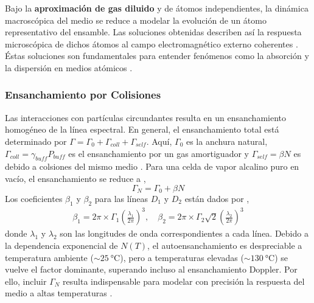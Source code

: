 Bajo la \textbf{aproximación de gas diluido} y de átomos independientes, la dinámica macroscópica del medio se reduce a modelar la evolución de un átomo representativo del ensamble. Las soluciones obtenidas describen así la respuesta microscópica de dichos átomos al campo electromagnético externo coherentes \cite{allenOpticalResonanceTwolevel1975}. Éstas soluciones son fundamentales para entender fenómenos como la absorción y  la dispersión en medios atómicos \cite{siddonsAbsoluteAbsorptionRubidium2008, fleischhauerElectromagneticallyInducedTransparency2005a}.
\subsubsection*{Ensanchamiento por Colisiones}
Las interacciones con partículas circundantes resulta en un ensanchamiento homogéneo de la línea espectral. En general, el ensanchamiento total está determinado por $\Gamma = \Gamma_0 + \Gamma_{coll} + \Gamma_{self}$. Aquí,  $\Gamma_0$ es la anchura natural, $\Gamma_{coll} = \gamma_{buff} P_{buff}$ es el ensanchamiento por un gas amortiguador y $\Gamma_{self} = \beta N$ es debido a colsiones del mismo medio  \cite{keaveneyAtomLightInteractions2014,rotondaroCollisionalBroadeningShift1997}. Para una celda de vapor alcalino puro en vacío, el ensanchamiento se reduce a \cite{siddonsAbsoluteAbsorptionRubidium2008},
\begin{equation}
    \boxed{
    \Gamma_N = \Gamma_0 + \beta N
    }
\end{equation}
Los coeficientes $\beta_1$ y $\beta_2$ para las líneas $D_1$ y $D_2$ están dados por \cite{siddonsAbsoluteAbsorptionRubidium2008, danieladamsteckQuantumAtomOptics2007},
\begin{equation}
    \begin{split}
        \beta_1 = 2 \pi \times  \Gamma_1 \left( \frac{\lambda_1}{2 \pi}\right)^3, \quad \beta_2 = 2 \pi \times \Gamma_2 \sqrt{2} \left( \frac{\lambda_2}{2 \pi}\right)^3
    \end{split}
\end{equation}
donde $\lambda_1$ y $\lambda_2$ son las longitudes de onda correspondientes a cada línea. Debido a la dependencia exponencial de $N(T)$, el autoensanchamiento es despreciable a temperatura ambiente (${\sim}\SI{25}{\degreeCelsius}$), pero a temperaturas elevadas (${\sim}\SI{130}{\degreeCelsius}$) se vuelve el factor dominante, superando incluso al ensanchamiento Doppler. Por ello, incluir $\Gamma_N$ resulta indispensable para modelar con precisión la respuesta del medio a altas temperaturas \cite{siddonsAbsoluteAbsorptionRubidium2008, pizzeyLaserSpectroscopyHot2022}.
